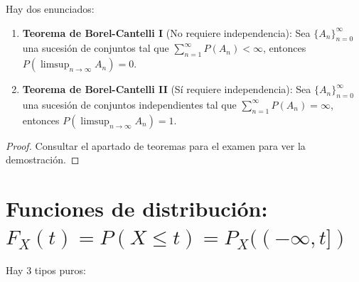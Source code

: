 \documentclass{apuntes}
\begin{document}
\begin{theorem}
Hay dos enunciados:
\begin{enumerate}
\item \textbf{Teorema de Borel-Cantelli I} (No requiere independencia): Sea $\{A_n\}_{n=0}^{\infty}$ una sucesión de conjuntos tal que $\sum_{n=1}^{\infty}P(A_n)< \infty$, entonces $P(\limsup_{n \rightarrow \infty}A_n)=0$.

\item \textbf{Teorema de Borel-Cantelli II} (Sí requiere independencia): Sea $\{A_n\}_{n=0}^{\infty}$ una sucesión de conjuntos independientes tal que $\sum_{n=1}^{\infty}P(A_n)= \infty$, entonces $P(\limsup_{n \rightarrow \infty}A_n)=1$.
\end{enumerate}
\end{theorem}
\begin{proof}
Consultar el apartado de teoremas para el examen para ver la demostración.
\end{proof}

\section{Funciones de distribución: $F_X(t)=P(X\leq t)=P_X((-\infty,t])$}
Hay 3 tipos puros:
\end{document}
